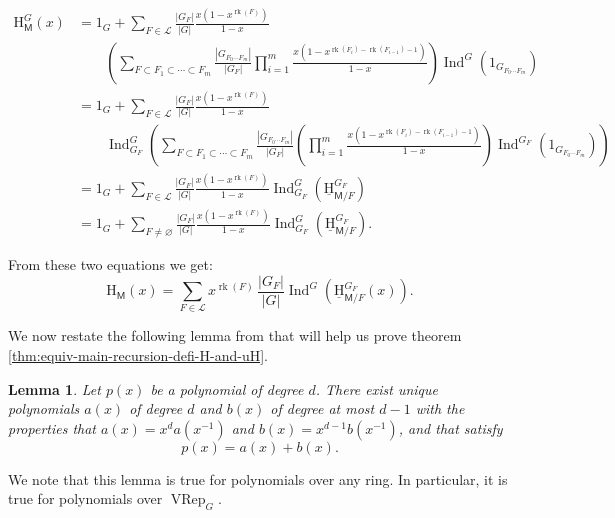 \documentclass[11pt, a4paper, english]{amsart}
\theoremstyle{teoremas}
\newtheorem{lemma}[theorem]{Lemma}
\theoremstyle{definition}
\DeclareMathOperator{\rk}{rk}
\newcommand{\M}{\mathsf{M}}
\renewcommand{\H}{\mathrm{H}}
\newcommand{\uH}{\underline{\mathrm{H}}}
\newcommand{\cL}{\mathcal{L}}
\newcommand{\VRep}{\operatorname{VRep}}
\newcommand{\Ind}{\operatorname{Ind}}
\begin{document}
\begin{align*}
    \H_{\M}^G(x) &= 1_G + \sum_{F\in\cL}\frac{|G_{F}|}{|G|}
        \frac{x(1-x^{\rk(F)})}{1-x}\\
        &\qquad\left(\sum_{F\subset F_1\subset \cdots \subset F_m}\frac{|G_{F_0\cdots F_m}|}{|G_F|}
        \prod_{i=1}^{m}{\frac{x(1-x^{\rk(F_i)-\rk(F_{i-1})-1})}{1-x}}\right)
        \Ind^G\left(1_{G_{F_0\cdots F_m}}\right)\\
        &= 1_G + \sum_{F\in\cL}\frac{|G_{F}|}{|G|}\frac{x(1-x^{\rk(F)})}{1-x}\\
        &\qquad
        \Ind^G_{G_F}\left(\sum_{F\subset F_1\subset \cdots \subset F_m}\frac{|G_{F_0\cdots F_m}|}{|G_F|}
        \left(\prod_{i=1}^{m}{\frac{x(1-x^{\rk(F_i)-\rk(F_{i-1})-1})}{1-x}}\right)
        \Ind^{G_F}\left(1_{G_{F_0\cdots F_m}}\right)\right)\\
        &= 1_G + \sum_{F\in\cL}\frac{|G_{F}|}{|G|}\frac{x(1-x^{\rk(F)})}{1-x}
        \Ind^G_{G_F}\left(\uH_{\M/F}^{G_F}\right)\\
        &= 1_G + \sum_{F\neq\varnothing}\frac{|G_{F}|}{|G|}\frac{x(1-x^{\rk(F)})}{1-x}
        \Ind^G_{G_F}\left(\uH_{\M/F}^{G_F}\right).
\end{align*}

From these two equations we get:
\[\H_\M(x) = \sum_{F\in\cL}x^{\rk(F)}\,\frac{|G_{F}|}{|G|}\Ind^G\left(\uH_{\M/F}^{G_F}(x)
\right).\]

We now restate the following lemma from \cite{fmsv24} that will help us prove
theorem \ref{thm:equiv-main-recursion-defi-H-and-uH}.

\begin{lemma}\label{lem:stapledon}
    Let $p(x)$ be a polynomial of degree $d$. There exist unique polynomials $a(x)$ of degree
$d$ and $b(x)$ of degree at most $d-1$ with the properties that $a(x)=x^da(x^{-1})$ and
$b(x) = x^{d-1}b(x^{-1})$, and that satisfy
\[p(x)=a(x)+b(x).\]
\end{lemma}
We note that this lemma is true for polynomials over any ring. In particular,
it is true for polynomials over $\VRep_G$.
\end{document}

